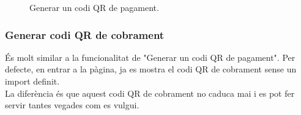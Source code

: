 \documentclass[a4paper,12pt,twoside]{ThesisStyle}
\begin{document}
\begin{figure}[h]
    \caption{Generar un codi QR de pagament.}
    \label{fig: Generar codi QR de pagament}
\end{figure}

\clearpage

\subsubsection{Generar codi QR de cobrament}
\label{subsubsec:Generar codi QR de cobrament}

És molt similar a la funcionalitat de "Generar un codi QR de pagament". Per defecte, en entrar a la pàgina, ja es mostra el codi QR de cobrament sense un import definit.\\

La diferència és que aquest codi QR de cobrament no caduca mai i es pot fer servir tantes vegades com es vulgui.
\end{document}
